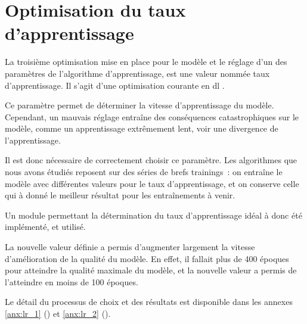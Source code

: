 \section{Optimisation du taux d'apprentissage}\label{lr_opti_papud}
La troisième optimisation mise en place pour le modèle et le réglage d'un des paramètres de l'algorithme d'apprentissage, est une valeur nommée \og taux d'apprentissage\fg{}. Il s'agit d'une optimisation courante en \gls{dl} \autocite{LearningRateOptimisation}.

Ce paramètre permet de déterminer la vitesse d'apprentissage du modèle.
Cependant, un mauvais réglage entraîne des conséquences catastrophiques sur le modèle, comme un apprentissage extrêmement lent, voir une divergence de l'apprentissage.

Il est donc nécessaire de correctement choisir ce paramètre.
Les algorithmes que nous avons étudiés reposent sur des séries de brefs \glspl{training}~: on entraîne le modèle avec différentes valeurs pour le taux d'apprentissage, et on conserve celle qui à donné le meilleur résultat pour les entraînements à venir.

Un module permettant la détermination du taux d'apprentissage idéal à donc été implémenté, et utilisé.

La nouvelle valeur définie a permis d'augmenter largement la vitesse d'amélioration de la qualité du modèle. En effet, il fallait plus de 400 époques pour atteindre la qualité maximale du modèle, et la nouvelle valeur a permis de l'atteindre en moins de 100 époques. %

Le détail du processus de choix et des résultats est disponible dans les annexes \ref{anx:lr_1} () et \ref{anx:lr_2} ().
